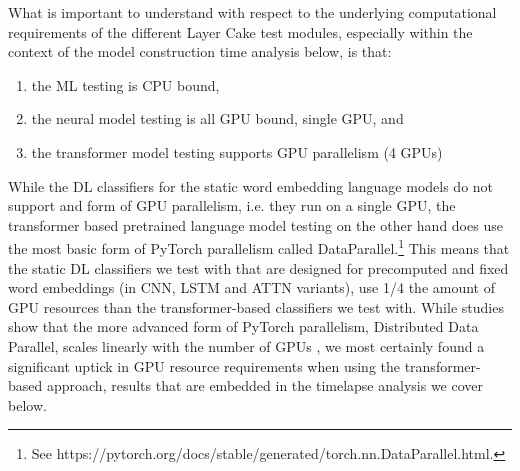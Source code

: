 \documentclass[final]{clv2025-revised}
\begin{document}
What is important to understand with respect to the underlying computational requirements of the different Layer Cake test modules, especially within the context of the model construction time analysis below, is that:
\begin{enumerate}
	\setlength\itemsep{2pt} %
    \item the ML testing is CPU bound,
    \item the neural model testing is all GPU bound, single GPU, and 
    \item the transformer model testing supports GPU parallelism (4 GPUs)
\end{enumerate}

While the DL classifiers for the static word embedding language models do not support and form of GPU parallelism, i.e. they run on a single GPU, the transformer based pretrained language model testing on the other hand does use the most basic form of PyTorch parallelism called  DataParallel.\footnote{See https://pytorch.org/docs/stable/generated/torch.nn.DataParallel.html.} This means that the static DL classifiers we test with that are designed for precomputed and fixed word embeddings (in CNN, LSTM and ATTN variants), use 1/4 the amount of GPU resources than the transformer-based classifiers we test with. While studies show that the more advanced form of PyTorch parallelism, Distributed Data Parallel, scales linearly with the number of GPUs \cite{li2020pytorchdistributedexperiencesaccelerating}, we most certainly found a significant uptick in GPU resource requirements when using the transformer-based approach, results that are embedded in the timelapse analysis we cover below.
\end{document}
